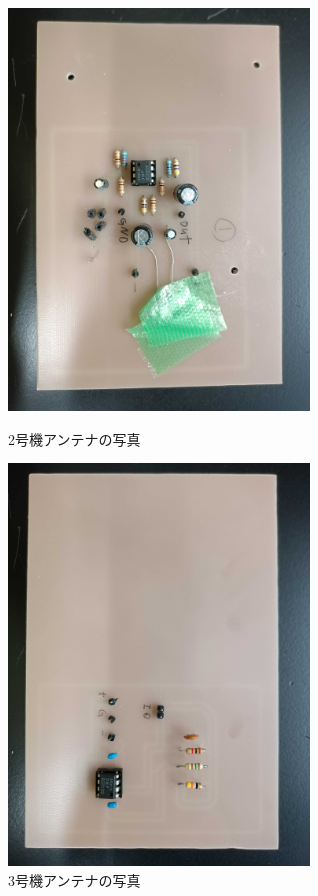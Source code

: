 \documentclass[report.tex]{subfiles}
\begin{document}
\begin{figure}[H]
	\begin{minipage}[b]{0.5\linewidth}
		\centering
		\includegraphics[width=8cm]{use/2.jpg}
		\caption{2号機アンテナの写真}
		\label{fig:s_6}
	\end{minipage}
	\begin{minipage}[b]{0.5\linewidth}
		\centering
		\includegraphics[width=8cm]{use/1.jpg}
		\caption{3号機アンテナの写真}
		\label{fig:s_7}
	\end{minipage}
\end{figure}
\end{document}
